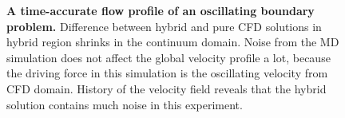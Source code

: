 \documentclass[preprint,12pt]{elsarticle}
\begin{document}
\begin{figure}
\centering
{}
\hskip 1cm
\vskip-0.2cm
\caption[]{\small {\bf A time-accurate flow profile of an oscillating boundary problem.}
 Difference between hybrid and pure CFD solutions in
hybrid region shrinks in the continuum domain. Noise from the MD simulation
does not affect the global velocity profile a lot, because the driving force
in this simulation is the oscillating velocity from CFD domain.
 History of the velocity field reveals that the
hybrid solution contains much noise in this experiment.}
\label{Stokes_Sol}
\end{figure}
\end{document}
